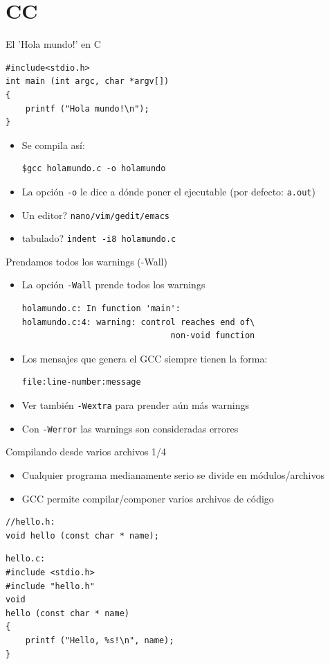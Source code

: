 \documentclass[xetex]{beamer}
\begin{document}
\section{CC}

\begin{frame}[fragile]{El 'Hola mundo!' en C}
\begin{lstlisting}
#include<stdio.h>
int main (int argc, char *argv[])
{
    printf ("Hola mundo!\n");
}
\end{lstlisting}

\begin{itemize}
\item Se compila así:
\begin{verbatim}
$gcc holamundo.c -o holamundo
\end{verbatim}
\item La opción \verb=-o= le dice a dónde poner el ejecutable (por defecto: \verb=a.out=)
\item Un editor? \verb=nano/vim/gedit/emacs=
\item tabulado? \verb=indent -i8 holamundo.c=
\end{itemize}

  
\end{frame}
\begin{frame}[fragile]{Prendamos todos los warnings (-Wall)}
  
\begin{itemize}
  \item La opción \verb=-Wall= prende todos los warnings
\begin{verbatim}
holamundo.c: In function 'main':
holamundo.c:4: warning: control reaches end of\
                              non-void function
\end{verbatim}
  \item Los mensajes que genera el GCC siempre tienen la forma:
\begin{verbatim}
file:line-number:message
\end{verbatim}
  \item Ver también \verb=-Wextra= para prender aún más warnings
  \item Con \verb=-Werror= las warnings son consideradas errores
\end{itemize}
\end{frame}

\begin{frame}[fragile]{Compilando desde varios archivos 1/4}
\begin{itemize}
  \item Cualquier programa medianamente serio se divide en módulos/archivos
  \item GCC permite compilar/componer varios archivos de código
\end{itemize}
\begin{lstlisting}
//hello.h:
void hello (const char * name);
\end{lstlisting}

\begin{lstlisting}
hello.c:
#include <stdio.h>
#include "hello.h"
void
hello (const char * name)
{
    printf ("Hello, %s!\n", name);
}
\end{lstlisting}
\end{frame}
\end{document}
